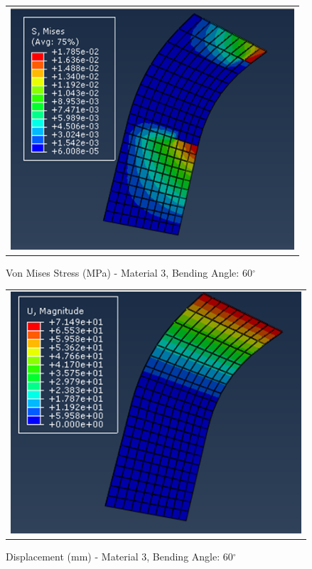 \documentclass[a4paper,12pt]{article}
\numberwithin{equation}{section}
\numberwithin{figure}{section}
\begin{document}
\begin{figure}[H]
  \centering
  \begin{tabular}{@{}c@{}}
    \includegraphics[width=0.7\linewidth,height=255pt]{Results/Bending/M3_VMS_60.png} \\
  \end{tabular}
  \caption{Von Mises Stress (MPa) - Material 3,  Bending Angle: 60$^{\circ}$ }
\end{figure}

\begin{figure}[H]
  \centering
  \begin{tabular}{@{}c@{}}
    \includegraphics[width=0.7\linewidth,height=255pt]{Results/Bending/M3_DIS_60.png} \\
  \end{tabular}
  \caption{Displacement (mm) - Material 3, Bending Angle: 60$^{\circ}$ }
\end{figure}
\end{document}
